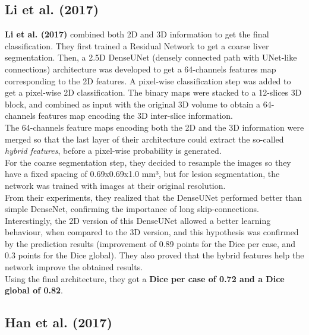\subsection{Li et al. (2017)}\label{li-et-al.-2017}

\textbf{Li et al. (2017)} combined both 2D and 3D information to get the
final classification. They first trained a Residual Network to get a
coarse liver segmentation. Then, a 2.5D DenseUNet (densely connected
path with UNet-like connections) architecture was developed to get a
64-channels features map corresponding to the 2D features. A pixel-wise
classification step was added to get a pixel-wise 2D classification. The
binary maps were stacked to a 12-slices 3D block, and combined as input
with the original 3D volume to obtain a 64-channels features map
encoding the 3D inter-slice information.\\
The 64-channels feature maps encoding both the 2D and the 3D information
were merged so that the last layer of their architecture could extract
the so-called \emph{hybrid features}, before a pixel-wise probability is
generated.\\
For the coarse segmentation step, they decided to resample the images so
they have a fixed spacing of 0.69x0.69x1.0 mm³, but for lesion
segmentation, the network was trained with images at their original
resolution.\\
From their experiments, they realized that the DenseUNet performed
better than simple DenseNet, confirming the importance of long
skip-connections. Interestingly, the 2D version of this DenseUNet
allowed a better learning behaviour, when compared to the 3D version,
and this hypothesis was confirmed by the prediction results (improvement
of 0.89 points for the Dice per case, and 0.3 points for the Dice
global). They also proved that the hybrid features help the network
improve the obtained results.\\
Using the final architecture, they got a \textbf{Dice per case of 0.72
and a Dice global of 0.82}.

\subsection{Han et al. (2017)}\label{han-et-al.-2017}

